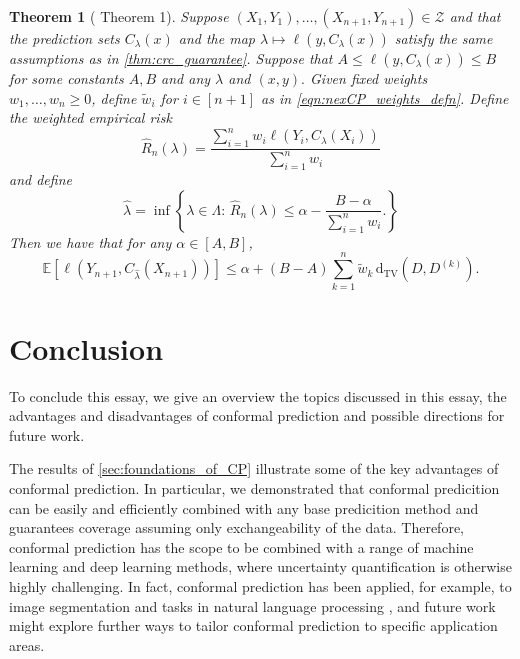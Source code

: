\documentclass[11pt, titlepage]{article} %
\newcommand{\R}{\mathrm}
\newcommand{\Exp}[3]{\mathbb{E}\left#2 #1 \right#3}
\numberwithin{equation}{section}
\newtheorem{theorem}{Theorem}
\theoremstyle{definition}
\numberwithin{theorem}{section}
\numberwithin{lemma}{section}
\numberwithin{corollary}{section}
\numberwithin{proposition}{section}
\numberwithin{definition}{section}
\numberwithin{remark}{section}
\begin{document}
\begin{theorem}[\cite{farinhas2024nonexchangeable} Theorem 1]
    Suppose \((X_1, Y_1), \ldots, (X_{n+1}, Y_{n+1}) \in \mathcal{Z}\) and that the prediction sets \(C_\lambda(x)\) and the map \(\lambda \mapsto \ell(y, C_\lambda(x))\) satisfy the same assumptions as in \cref{thm:crc_guarantee}. Suppose that \(A \leq \ell(y, C_\lambda(x)) \leq B\) for some constants \(A, B\) and any \(\lambda\) and \((x,y).\) Given fixed weights \(w_1, \ldots, w_n \geq 0\), define \(\tilde{w}_i\) for \(i \in [n+1]\) as in \eqref{eqn:nexCP_weights_defn}. Define the weighted empirical risk \[\hat{R}_n(\lambda) = \frac{\sum_{i=1}^{n} w_i \ell(Y_i, C_\lambda(X_i))}{\sum_{i=1}^{n} w_i}\] and define \[\hat{\lambda} = \inf \left\{ \lambda \in \Lambda : \, \hat{R}_n(\lambda) \leq \alpha - \frac{B - \alpha}{\sum_{i=1}^{n} w_i}. \right\}\] Then we have that for any \(\alpha \in [A,B]\), \[\Exp{\ell(Y_{n+1}, C_{\hat{\lambda}}(X_{n+1}))}{[}{]} \leq \alpha + (B-A)\sum_{k=1}^{n} \tilde{w}_k \, \R{d_{TV}}(D, D^{(k)}).\]
\end{theorem}

\section{Conclusion}

To conclude this essay, we give an overview the topics discussed in this essay, the advantages and disadvantages of conformal prediction and possible directions for future work. \vskip5pt

\noindent
The results of \cref{sec:foundations_of_CP} illustrate some of the key advantages of conformal prediction. In particular, we demonstrated that conformal predicition can be easily and efficiently combined with any base predicition method and guarantees coverage assuming only exchangeability of the data. Therefore, conformal prediction has the scope to be combined with a range of machine learning and deep learning methods, where uncertainty quantification is otherwise highly challenging. In fact, conformal prediction has been applied, for example, to image segmentation \cite{angelopoulos2024riskcontrol, mossina2024conformal} and tasks in natural language processing \cite{campos2024conformalpredictionnaturallanguage, cherian2024large}, and future work might explore further ways to tailor conformal prediction to specific application areas. \vskip5pt
\end{document}

